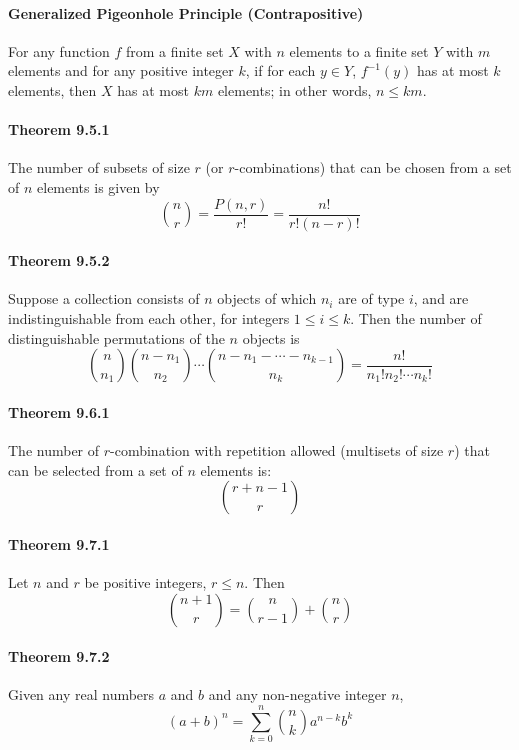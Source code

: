 \documentclass[a4paper]{article}
\newcommand{\inv}{^{-1}}
\begin{document}
\begin{multicols*}{3}
    \paragraph{Generalized Pigeonhole Principle (Contrapositive)} For any function $f$ from a finite set $X$ with $n$ elements to a finite set $Y$ with $m$ elements and for any positive integer $k$, if for each $y \in Y$, $f\inv({y})$ has at most $k$ elements, then $X$ has at most $km$ elements; in other words, $n \leq km$.
    \paragraph{Theorem 9.5.1} The number of subsets of size $r$ (or $r$-combinations) that can be chosen from a set of $n$ elements is given by
      \begin{equation*}
        {n \choose r} = \dfrac{P(n,r)}{r!} = \dfrac{n!}{r!(n-r)!}
      \end{equation*}
    \paragraph{Theorem 9.5.2} Suppose a collection consists of $n$ objects of which $n_i$ are of type $i$, and are indistinguishable from each other, for integers $1 \leq i \leq k$. Then the number of distinguishable permutations of the $n$ objects is
      \begin{equation*}
        {n \choose n_1} {n-n_1 \choose n_2} \cdots {n-n_1-\cdots-n_{k-1} \choose n_k} = \dfrac{n!}{n_1!n_2! \cdots n_k!}
      \end{equation*}
    \paragraph{Theorem 9.6.1} The number of $r$-combination with repetition allowed (multisets of size $r$) that can be selected from a set of $n$ elements is:
      \begin{equation*}
        {r+n-1 \choose r}
      \end{equation*}
    \paragraph{Theorem 9.7.1} Let $n$ and $r$ be positive integers, $r \leq n$. Then
      \begin{equation*}
        {n+1 \choose r} = {n \choose r-1} + {n \choose r}
      \end{equation*}
    \paragraph{Theorem 9.7.2} Given any real numbers $a$ and $b$ and any non-negative integer $n$,
      \begin{equation*}
        (a+b)^n = \sum_{k=0}^n {n \choose k} a^{n-k} b^k
      \end{equation*}

\end{multicols*}
\end{document}
